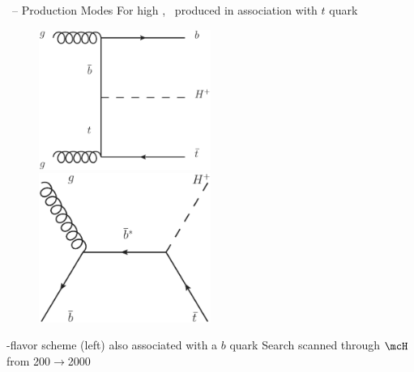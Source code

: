 \documentclass[10pt]{beamer}
\begin{document}
\begin{frame}{\Hplus\ -- Production Modes}
\centering
{\large\color{blue} For high \mcH, \Hplus\ produced in association with $t$ quark}
\begin{figure}
   \includegraphics[width=0.5\textwidth]{figures/feynmanIIIa.eps}
   \includegraphics[width=0.5\textwidth]{figures/feynmanIIa.eps}
\end{figure}

\begin{outline}
-flavor scheme (left) also associated with a $b$ quark
\1 Search scanned through $\mcH$ from 200$\to$2000~\GeV
\end{outline}
\end{frame}
\end{document}
